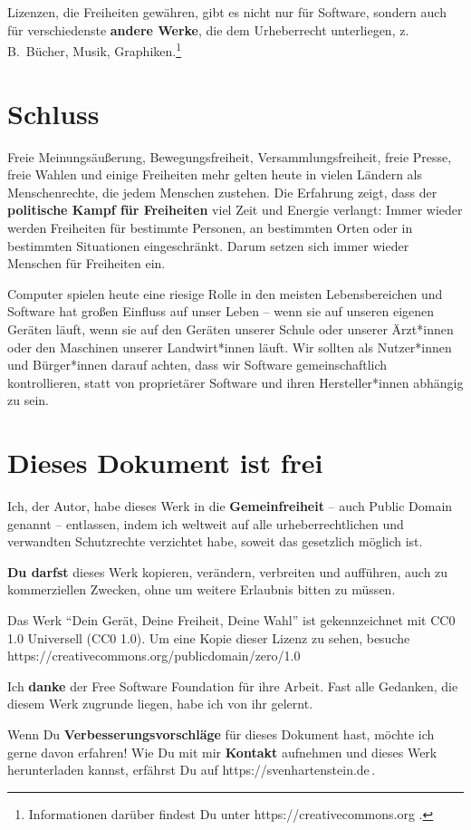 \documentclass[a5paper,12pt]{scrartcl}
\begin{document}
Lizenzen, die Freiheiten gewähren, gibt es nicht nur für Software,
sondern auch für verschiedenste \textbf{andere Werke}, die dem
Urheberrecht unterliegen, z.\,B.\ Bücher, Musik,
Graphiken.\footnote{Informationen darüber findest Du unter
  https://creativecommons.org .}

\vspace{-4pt} %

\section{Schluss}

Freie Meinungsäußerung, Bewegungsfreiheit, Versammlungsfreiheit, freie
Presse, freie Wahlen und einige Freiheiten mehr gelten heute in vielen
Ländern als Menschenrechte, die jedem Menschen zustehen. Die Erfahrung
zeigt, dass der \textbf{politische Kampf für Freiheiten} viel Zeit und
Energie verlangt: Immer wieder werden Freiheiten für bestimmte
Personen, an bestimmten Orten oder in bestimmten Situationen
eingeschränkt. Darum setzen sich immer wieder Menschen für Freiheiten
ein.

Computer spielen heute eine riesige Rolle in den meisten
Lebensbereichen und Software hat großen Einfluss auf unser Leben --
wenn sie auf unseren eigenen Geräten läuft, wenn sie auf den Geräten
unserer Schule oder unserer Ärzt*innen oder den Maschinen unserer
Landwirt*innen läuft. Wir sollten als Nutzer*innen und Bürger*innen
darauf achten, dass wir Software gemeinschaftlich kontrollieren, statt
von proprietärer Software und ihren Hersteller*innen abhängig zu sein.


\section{Dieses Dokument ist frei}

Ich, der Autor, habe dieses Werk in die \textbf{Gemeinfreiheit} --
auch Public Domain genannt -- entlassen, indem ich weltweit auf alle
urheberrechtlichen und verwandten Schutzrechte verzichtet habe, soweit
das gesetzlich möglich ist.

\textbf{Du darfst} dieses Werk kopieren, verändern, verbreiten und
aufführen, auch zu kommerziellen Zwecken, ohne um weitere Erlaubnis
bitten zu müssen.

Das Werk "`Dein Gerät, Deine Freiheit, Deine Wahl"' %
ist gekennzeichnet mit CC0 1.0 Universell (CC0
1.0). Um eine Kopie dieser Lizenz zu sehen,
besuche\\
https://creativecommons.org/publicdomain/zero/1.0

Ich \textbf{danke} der Free Software Foundation für ihre Arbeit. Fast
alle Gedanken, die diesem Werk zugrunde liegen, habe ich von ihr
gelernt.

Wenn Du \textbf{Verbesserungsvorschläge} für dieses Dokument hast,
möchte ich gerne davon erfahren! Wie Du mit mir \textbf{Kontakt}
aufnehmen und dieses Werk herunterladen kannst, erfährst Du auf
https://svenhartenstein.de\,.
\end{document}
